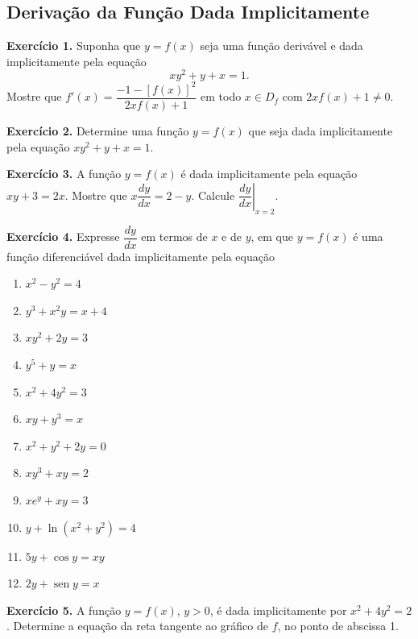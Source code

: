 \documentclass[12pt,a4paper]{article}
\begin{document}
\subsection{Derivação da Função Dada Implicitamente}
\vspace{0.5cm}
\noindent\textbf{Exercício 1.}
Suponha que $y = f(x)$ seja uma função derivável e dada implicitamente pela equação
\[
xy^2 + y + x = 1.
\]
Mostre que $f'(x) = \dfrac{-1 - [f(x)]^2}{2xf(x) + 1}$ em todo $x \in D_f$ com $2xf(x) + 1 \neq 0$.

\vspace{0.5cm}
\noindent\textbf{Exercício 2.}
Determine uma função $y = f(x)$ que seja dada implicitamente pela equação $xy^2 + y + x = 1$.

\vspace{0.5cm}
\noindent\textbf{Exercício 3.}
A função $y = f(x)$ é dada implicitamente pela equação $xy + 3 = 2x$. Mostre que $x\dfrac{dy}{dx} = 2 - y$. Calcule $\left.\dfrac{dy}{dx}\right|_{x = 2}$.

\vspace{0.5cm}
\noindent\textbf{Exercício 4.}
Expresse $\dfrac{dy}{dx}$ em termos de $x$ e de $y$, em que $y = f(x)$ é uma função diferenciável dada implicitamente pela equação
\begin{enumerate}
    \renewcommand{\theenumi}{\alph{enumi}}
    \renewcommand{\labelenumi}{\theenumi)}
    \item $x^2 - y^2 = 4$
    \item $y^3 + x^2 y = x + 4$
    \item $xy^2 + 2y = 3$
    \item $y^5 + y = x$
    \item $x^2 + 4y^2 = 3$
    \item $xy + y^3 = x$
    \item $x^2 + y^2 + 2y = 0$
    \item $xy^3 + xy = 2$
    \item $xe^y + xy = 3$
    \item $y + \ln(x^2 + y^2) = 4$
    \item $5y + \cos y = xy$
    \item $2y + \operatorname{sen} y = x$
\end{enumerate}

\vspace{0.5cm}
\noindent\textbf{Exercício 5.}
A função $y = f(x)$, $y > 0$, é dada implicitamente por $x^2 + 4y^2 = 2$. Determine a equação da reta tangente ao gráfico de $f$, no ponto de abscissa 1.
\end{document}
